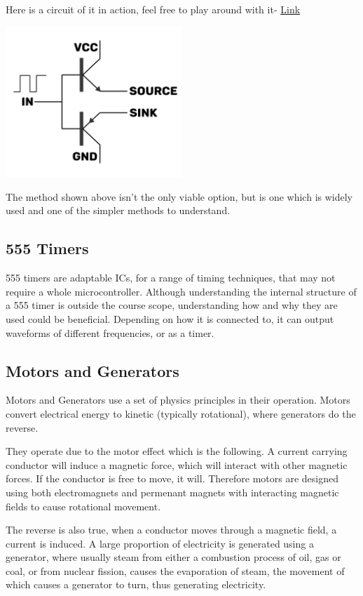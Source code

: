 \documentclass[a4paper,11pt]{report}
\begin{document}
Here is a circuit of it in action, feel free to play around with it- \href{https://tinyurl.com/2m77d6zl}{Link}

\includegraphics[width=0.5\textwidth]{gatedriver1}

The method shown above isn't the only viable option, but is one which is widely used and one of the simpler methods to understand.

\subsection{555 Timers}

555 timers are adaptable ICs, for a range of timing techniques, that may not require a whole microcontroller. Although understanding the internal structure of a 555 timer is outside the course scope, understanding how and why they are used could be beneficial.
Depending on how it is connected to, it can output waveforms of different frequencies, or as a timer.

\subsection{Motors and Generators}

Motors and Generators use a set of physics principles in their operation. Motors convert electrical energy to kinetic (typically rotational), where generators do the reverse.

They operate due to the motor effect which is the following. A current carrying conductor will induce a magnetic force, which will interact with other magnetic forces. If the conductor is free to move, it will. Therefore motors are designed using both electromagnets and permenant magnets with interacting magnetic fields to cause rotational movement.

The reverse is also true, when a conductor moves through a magnetic field, a current is induced. A large proportion of electricity is generated using a generator, where usually steam from either a combustion process of oil, gas or coal, or from nuclear fission, causes the evaporation of steam, the movement of which causes a generator to turn, thus generating electricity.
\end{document}
